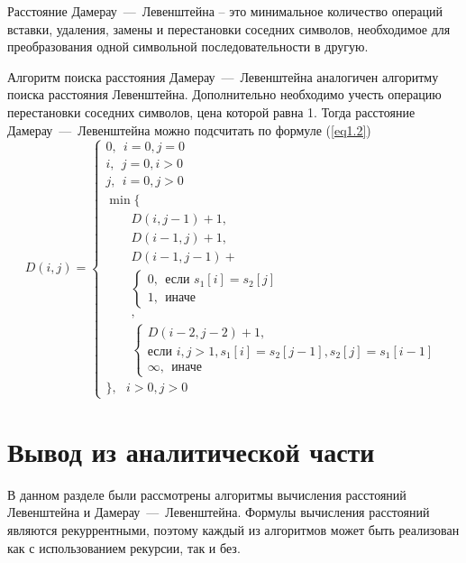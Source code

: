 Расстояние Дамерау~---~Левенштейна -- это минимальное количество операций вставки, удаления, замены и перестановки соседних символов, необходимое для преобразования одной символьной последовательности в другую.

Алгоритм поиска расстояния Дамерау~---~Левенштейна аналогичен алгоритму поиска расстояния Левенштейна. Дополнительно необходимо учесть операцию перестановки соседних символов, цена которой равна 1. Тогда расстояние Дамерау~---~Левенштейна можно подсчитать по формуле (\ref{eq1.2})
\begin{equation}
	\label{eq1.2}
	D(i, j) = \begin{cases}
		0, ~~\text{$i = 0, j = 0$}\\
		i, ~~\text{$j = 0, i > 0$}\\
		j, ~~\text{$i = 0, j > 0$}\\
		\min \lbrace \\
		\qquad D(i, j - 1) + 1,\\
		\qquad D(i - 1, j) + 1,\\
		\qquad D(i - 1, j - 1) + \\
		\qquad \begin{cases}
			0, ~~\text{если $s_1[i] = s_2[j]$}\\
			1, ~~\text{иначе}
		\end{cases}\\
		\qquad,\\
		\qquad \begin{cases}
			D(i - 2, j - 2) + 1, \\
			\text{если $i, j > 1, s_1[i] = s_2[j - 1], s_2[j] = s_1[i - 1]$}\\
			\infty, ~~\text{иначе}
		\end{cases}\\
		\rbrace, ~~~\text{$i > 0, j > 0$}
	\end{cases}
\end{equation}

\section*{Вывод из аналитической части}

В данном разделе были рассмотрены алгоритмы вычисления расстояний Левенштейна и Дамерау~---~Левенштейна. Формулы вычисления расстояний являются рекуррентными, поэтому каждый из алгоритмов может быть реализован как с использованием рекурсии, так и без. 
